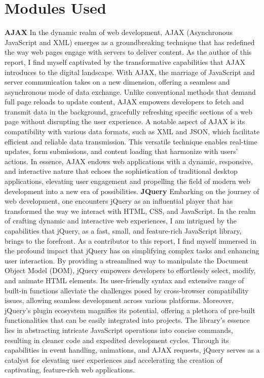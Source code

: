 \section{Modules Used}
\textbf{AJAX}
\newline
In the dynamic realm of web development, AJAX (Asynchronous JavaScript and XML) emerges as a groundbreaking technique that has redefined the way web pages engage with servers to deliver content. As the author of this report, I find myself captivated by the transformative capabilities that AJAX introduces to the digital landscape. With AJAX, the marriage of JavaScript and server communication takes on a new dimension, offering a seamless and asynchronous mode of data exchange. Unlike conventional methods that demand full page reloads to update content, AJAX empowers developers to fetch and transmit data in the background, gracefully refreshing specific sections of a web page without disrupting the user experience. A notable aspect of AJAX is its compatibility with various data formats, such as XML and JSON, which facilitate efficient and reliable data transmission. This versatile technique enables real-time updates, form submissions, and content loading that harmonize with users' actions. In essence, AJAX endows web applications with a dynamic, responsive, and interactive nature that echoes the sophistication of traditional desktop applications, elevating user engagement and propelling the field of modern web development into a new era of possibilities.
\newline
\newline
\textbf{JQuery}
\newline
Embarking on the journey of web development, one encounters jQuery as an influential player that has transformed the way we interact with HTML, CSS, and JavaScript. In the realm of crafting dynamic and interactive web experiences, I am intrigued by the capabilities that jQuery, as a fast, small, and feature-rich JavaScript library, brings to the forefront. As a contributor to this report, I find myself immersed in the profound impact that jQuery has on simplifying complex tasks and enhancing user interaction. By providing a streamlined way to manipulate the Document Object Model (DOM), jQuery empowers developers to effortlessly select, modify, and animate HTML elements. Its user-friendly syntax and extensive range of built-in functions alleviate the challenges posed by cross-browser compatibility issues, allowing seamless development across various platforms. Moreover, jQuery's plugin ecosystem magnifies its potential, offering a plethora of pre-built functionalities that can be easily integrated into projects. The library's essence lies in abstracting intricate JavaScript operations into concise commands, resulting in cleaner code and expedited development cycles. Through its capabilities in event handling, animations, and AJAX requests, jQuery serves as a catalyst for elevating user experiences and accelerating the creation of captivating, feature-rich web applications.
